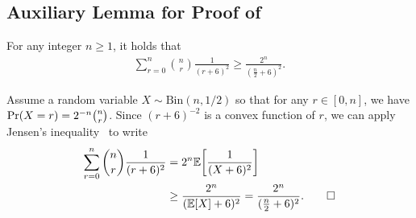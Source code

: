 \subsection{Auxiliary Lemma for Proof of } \label{app::sum-binom-jensen}

\begin{lemma} \label{lem::binom-sum-jensen}
    For any integer $n \geq 1$, it holds that
    \begin{align*}
        \sum_{r=0}^{n} \binom{n}{r} \frac{1}{(r+6)^{2}} \geq \frac{2^{n}}{\left(\frac{n}{2}+6\right)^2}.
    \end{align*}
\end{lemma}
\begin{IEEEproof}
    Assume a random variable $X \sim \mathrm{Bin}(n,1/2)$ so that for any $r \in [0,n]$, we have $\mathrm{Pr}(X = r) = 2^{-n} \binom{n}{r}$. Since $(r+6)^{-2}$ is a convex function of $r$, we can apply Jensen's inequality~\cite{mitzenmacherProbabilityComputingRandomized2005} to write
    \begin{align}
        \sum_{r=0}^{n} \binom{n}{r} \frac{1}{(r+6)^{2}} &= 2^{n} \mathbb{E}\sparenv*{\frac{1}{(X+6)^2}}\nonumber \\
        &\geq \frac{2^{n}}{(\mathbb{E}[X]+6)^2} = \frac{2^{n}}{(\frac{n}{2}+6)^2}.\nonumber \qedhere
    \end{align}
\end{IEEEproof}